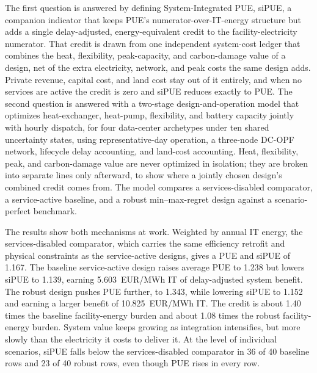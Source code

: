 \documentclass[preprint,12pt]{elsarticle}
\begin{document}
The first question is answered by defining System-Integrated PUE, siPUE, a companion indicator that keeps PUE's numerator-over-IT-energy structure but adds a single delay-adjusted, energy-equivalent credit to the facility-electricity numerator. That credit is drawn from one independent system-cost ledger that combines the heat, flexibility, peak-capacity, and carbon-damage value of a design, net of the extra electricity, network, and peak costs the same design adds. Private revenue, capital cost, and land cost stay out of it entirely, and when no services are active the credit is zero and siPUE reduces exactly to PUE. The second question is answered with a two-stage design-and-operation model that optimizes heat-exchanger, heat-pump, flexibility, and battery capacity jointly with hourly dispatch, for four data-center archetypes under ten shared uncertainty states, using representative-day operation, a three-node DC-OPF network, lifecycle delay accounting, and land-cost accounting. Heat, flexibility, peak, and carbon-damage value are never optimized in isolation; they are broken into separate lines only afterward, to show where a jointly chosen design's combined credit comes from. The model compares a services-disabled comparator, a service-active baseline, and a robust min--max-regret design against a scenario-perfect benchmark.

The results show both mechanisms at work. Weighted by annual IT energy, the services-disabled comparator, which carries the same efficiency retrofit and physical constraints as the service-active designs, gives a PUE and siPUE of 1.167. The baseline service-active design raises average PUE to 1.238 but lowers siPUE to 1.139, earning 5.603~EUR/MWh IT of delay-adjusted system benefit. The robust design pushes PUE further, to 1.343, while lowering siPUE to 1.152 and earning a larger benefit of 10.825~EUR/MWh IT. The credit is about 1.40 times the baseline facility-energy burden and about 1.08 times the robust facility-energy burden. System value keeps growing as integration intensifies, but more slowly than the electricity it costs to deliver it. At the level of individual scenarios, siPUE falls below the services-disabled comparator in 36 of 40 baseline rows and 23 of 40 robust rows, even though PUE rises in every row.
\end{document}

